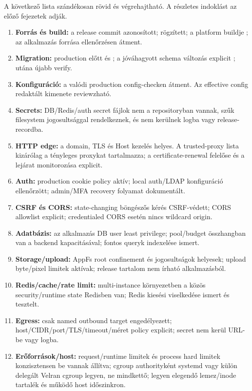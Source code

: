 A következő lista szándékosan rövid és végrehajtható. A részletes indoklást az előző fejezetek adják.

\begin{enumerate}
  \item \textbf{Forrás és build:} a release commit azonosított;  rögzített; a platform buildje ; az alkalmazás forrása  ellenőrzésen átment.
  \item \textbf{Migration:} production előtt  és ; a jóváhagyott schema változás explicit ; utána újabb verify.
  \item \textbf{Konfiguráció:} a valódi production  config-checken átment. Az effective config redaktált kimenete reviewzható.
  \item \textbf{Secrets:} DB/Redis/auth secret fájlok nem a repositoryban vannak, szűk filesystem jogosultsággal rendelkeznek, és nem kerülnek logba vagy release-recordba.
  \item \textbf{HTTP edge:} a domain, TLS és Host kezelés helyes. A trusted-proxy lista kizárólag a tényleges proxykat tartalmazza; a certificate-renewal felelőse és a lejárat monitorozása explicit.
  \item \textbf{Auth:} production cookie policy aktív; local auth/LDAP konfiguráció ellenőrzött; admin/MFA recovery folyamat dokumentált.
  \item \textbf{CSRF és CORS:} state-changing böngészős kérés CSRF-védett; CORS allowlist explicit; credentialed CORS esetén nincs wildcard origin.
  \item \textbf{Adatbázis:} az alkalmazás DB user least privilege; pool/budget összhangban van a backend kapacitásával; fontos queryk indexelése ismert.
  \item \textbf{Storage/upload:} AppFs root confinement és jogosultságok helyesek; upload byte/pixel limitek aktívak; release tartalom nem írható alkalmazásból.
  \item \textbf{Redis/cache/rate limit:} multi-instance környezetben a közös security/runtime state Redisben van; Redis kiesési viselkedése ismert és tesztelt.
  \item \textbf{Egress:} csak named outbound target engedélyezett; host/CIDR/port/TLS/timeout/méret policy explicit; secret nem kerül URL-be vagy logba.
  \item \textbf{Erőforrások/host:} request/runtime limitek és process hard limitek konzisztensen be vannak állítva; cgroup authorityként systemd vagy külön delegált Velran cgroup legyen, ne mindkettő; legyen elegendő lemez/inode tartalék és működő host időszinkron.

\end{enumerate}
